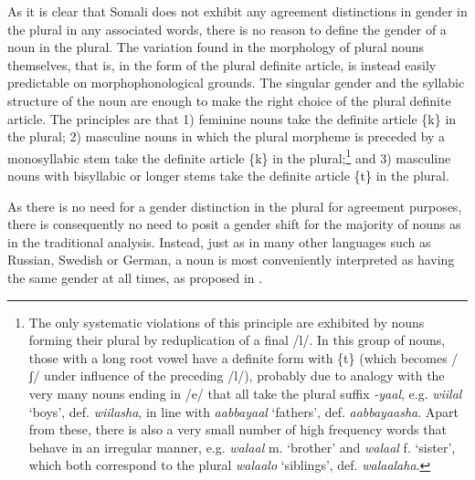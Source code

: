 \documentclass[output=paper]{langsci/langscibook}
\begin{document}
As it is clear that Somali does not exhibit any agreement distinctions in gender in the plural in any associated words, there is no reason to define the gender of a noun in the plural. The variation found in the morphology of plural nouns themselves, that is, in the form of the plural definite article, is instead easily predictable on morphophonological grounds. The singular gender and the syllabic structure of the noun are enough to make the right choice of the plural definite article. The principles are that 1) feminine nouns take the definite article \{k\} in the plural; 2) masculine nouns in which the plural morpheme is preceded by a monosyllabic stem take the definite article \{k\} in the plural;\footnote{The only systematic violations of this principle are exhibited by nouns forming their plural by reduplication of a final /l/. In this group of nouns, those with a long root vowel have a definite form with \{t\} (which becomes /ʃ/ under influence of the preceding /l/), probably due to analogy with the very many nouns ending in /e/ that all take the plural suffix \textit{-yaal}, e.g. \textit{wiilal} ‘boys’, def. \textit{wiilasha}, in line with \textit{aabbayaal} ‘fathers’, def. \textit{aabbayaasha}. Apart from these, there is also a very small number of high frequency words that behave in an irregular manner, e.g. \textit{walaal} m. ‘brother’ and \textit{walaal} f. ‘sister’, which both correspond to the plural \textit{walaalo} ‘siblings’, def. \textit{walaalaha}.} and 3) masculine nouns with bisyllabic or longer stems take the definite article \{t\} in the plural.

As there is no need for a gender distinction in the plural for agreement purposes, there is consequently no need to posit a gender shift for the majority of nouns as in the traditional analysis. Instead, just as in many other languages such as Russian, Swedish or German, a noun is most conveniently interpreted as having the same gender at all times, as proposed in . 
 
\end{document}
